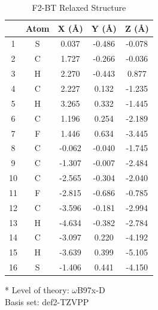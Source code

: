 \begin{table}[hbt!]\centering
\caption{F2-BT Relaxed Structure}
\renewcommand{\arraystretch}{1.5}
\begin{threeparttable}
\begin{tabular}{ccccc}\toprule
{} & {Atom} & {X (\AA)} & {Y (\AA)} & {Z (\AA)} \\ \midrule
    1 & S & 0.037 & -0.486 & -0.078\\
    2 & C & 1.727 & -0.266 & -0.036\\
    3 & H & 2.270 & -0.443 & 0.877\\
    4 & C & 2.227 & 0.132 & -1.235\\
    5 & H & 3.265 & 0.332 & -1.445\\
    6 & C & 1.196 & 0.254 & -2.189\\
    7 & F & 1.446 & 0.634 & -3.445\\
    8 & C & -0.062 & -0.040 & -1.745\\
    9 & C & -1.307 & -0.007 & -2.484\\
    10 & C & -2.565 & -0.304 & -2.040\\
    11 & F & -2.815 & -0.686 & -0.785\\
    12 & C & -3.596 & -0.181 & -2.994\\
    13 & H & -4.634 & -0.382 & -2.784\\
    14 & C & -3.097 & 0.220 & -4.192\\
    15 & H & -3.639 & 0.399 & -5.105\\
    16 & S & -1.406 & 0.441 & -4.150\\ \bottomrule
\end{tabular}
\begin{tablenotes}
\item[*] \footnotesize Level of theory: $\omega$B97x-D \\ Basis set: def2-TZVPP
\end{tablenotes}
\end{threeparttable}
\end{table}


